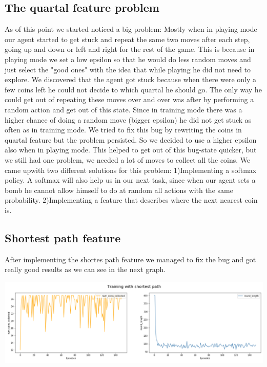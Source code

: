 \subsection{The quartal feature problem}
As of this point we started noticed a big problem: Mostly when in playing mode our agent started to get stuck and repeat the same two moves after each step, going up and down or left and right for the rest of the game. This is because in playing mode we set a low epsilon so that he would do less random moves and just select the "good ones" with the idea that while playing he did not need to explore. We discovered that the agent got stuck because when there were only a few coins left he could not decide to which quartal he should go. The only way he could get out of repeating these moves over and over was after by performing a random action and get out of this state. Since in training mode there was a higher chance of doing a random move (bigger epsilon) he did not get stuck as often as in training mode. We tried to fix this bug by rewriting the coins in quartal feature but the problem persisted. So we decided to use a higher epsilon also when in playing mode. This helped to get out of this bug-state quicker, but we still had one problem, we needed a lot of moves to collect all the coins. We came upwith two different solutions for this problem: 1)Implementing a softmax policy. A softmax will also help us in our next task, since when our agent sets a bomb he cannot allow himself to do at random all actions with the same probability. 2)Implementing a feature that describes where the next nearest coin is.

\subsection{Shortest path feature}
After implementing the shortes path feature we managed to fix the bug and got really good results as we can see in the next graph.
\begin{center}
\includegraphics[scale=0.22]{graphics/plot04.png}
\end{center}

